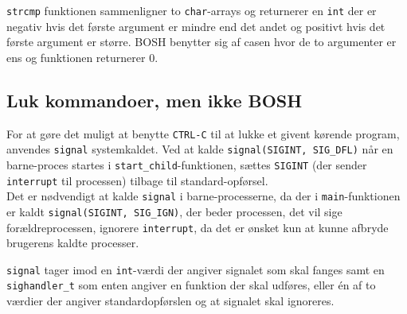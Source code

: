 \texttt{strcmp} funktionen sammenligner to \texttt{char}-arrays og returnerer en \texttt{int} der er negativ hvis det første argument er mindre end det andet og positivt hvis det første argument er større. BOSH benytter sig af casen hvor de to argumenter er ens og funktionen returnerer 0.

\subsection{Luk kommandoer, men ikke BOSH}
For at gøre det muligt at benytte \texttt{CTRL-C} til at lukke et givent kørende program, anvendes \texttt{signal} systemkaldet. Ved at kalde \texttt{signal(SIGINT, SIG\_DFL)} når en barne-proces startes i \texttt{start\_child}-funktionen, sættes \texttt{SIGINT} (der sender \texttt{interrupt} til processen) tilbage til standard-opførsel.\\

Det er nødvendigt at kalde \texttt{signal} i barne-processerne, da der i \texttt{main}-funktionen er kaldt \texttt{signal(SIGINT, SIG\_IGN)}, der beder processen, det vil sige forældreprocessen, ignorere \texttt{interrupt}, da det er ønsket kun at kunne afbryde brugerens kaldte processer. 

\texttt{signal} tager imod en \texttt{int}-værdi der angiver signalet som skal fanges samt en \texttt{sighandler\_t} som enten angiver en funktion der skal udføres, eller én af to værdier der angiver standardopførslen og at signalet skal ignoreres.